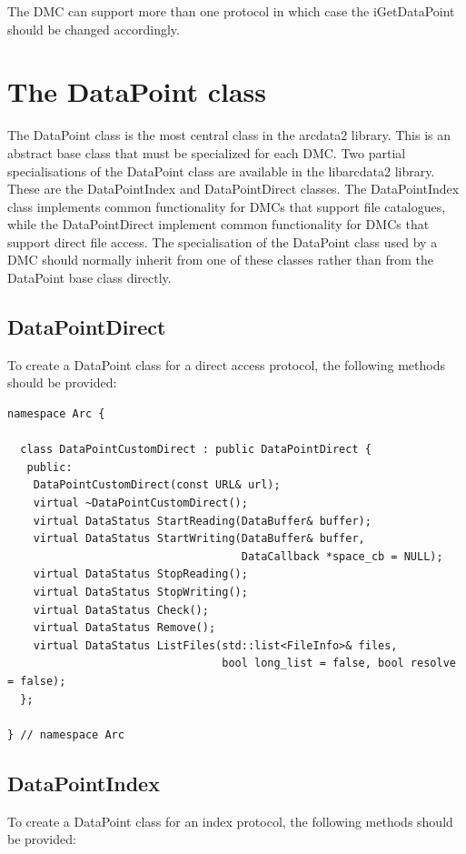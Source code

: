 \documentclass{book}
\begin{document}
The DMC can support more than one protocol in which case the
iGetDataPoint should be changed accordingly.

\chapter{The DataPoint class}
\label{sec:DataPoint}

The DataPoint class is the most central class in the arcdata2
library. This is an abstract base class that must be specialized for
each DMC. Two partial specialisations of the DataPoint class are
available in the libarcdata2 library. These are the DataPointIndex and
DataPointDirect classes. The DataPointIndex class implements common
functionality for DMCs that support file catalogues, while the
DataPointDirect implement common functionality for DMCs that support
direct file access. The specialisation of the DataPoint class used by
a DMC should normally inherit from one of these classes rather than
from the DataPoint base class directly.

\section{DataPointDirect}

To create a DataPoint class for a direct access protocol, the
following methods should be provided:

\begin{verbatim}
namespace Arc {

  class DataPointCustomDirect : public DataPointDirect {
   public:
    DataPointCustomDirect(const URL& url);
    virtual ~DataPointCustomDirect();
    virtual DataStatus StartReading(DataBuffer& buffer);
    virtual DataStatus StartWriting(DataBuffer& buffer,
                                    DataCallback *space_cb = NULL);
    virtual DataStatus StopReading();
    virtual DataStatus StopWriting();
    virtual DataStatus Check();
    virtual DataStatus Remove();
    virtual DataStatus ListFiles(std::list<FileInfo>& files,
                                 bool long_list = false, bool resolve = false);
  };

} // namespace Arc
\end{verbatim}

\section{DataPointIndex}

To create a DataPoint class for an index protocol, the following
methods should be provided:
\end{document}
